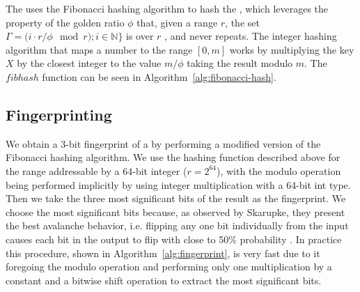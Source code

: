 The \dBHT uses the Fibonacci hashing algorithm \cite{Skarupke2018} to hash the \kmers, which leverages the property of the golden ratio $\phi$ that, given a range $r$, the set $\Gamma = {(i\cdot r}/{\phi} \mod r) ; i \in \mathbb{N}\}$ is  over $r$ , and never repeats. The integer hashing algorithm that maps a number to the range $[0, m]$ works by multiplying the key $X$ by the closest integer to the value $m/\phi$ taking the result modulo $m$. The $\mathit{fibhash}$ function can be seen in Algorithm~\ref{alg:fibonacci-hash}.

\begin{algorithm}
  \caption{$\mathit{fibhash}(X, m)$}\label{alg:fibonacci-hash}
\end{algorithm}

\subsection{\kmer Fingerprinting}\label{sec:fingerprint}

We obtain a 3-bit fingerprint of a \kmer by performing a modified version of the Fibonacci hashing algorithm. We use the hashing function described above for the range addressable by a 64-bit integer ($r=2^{64}$), with the modulo operation being performed implicitly by using integer multiplication with a 64-bit int type. Then we take the three most significant bits of the result as the fingerprint. We choose the most significant bits because, as observed by Skarupke, they present the best avalanche behavior, i.e. flipping any one bit individually from the input causes each bit in the output to flip with close to 50\% probability \cite{Skarupke2018}. In practice this procedure, shown in Algorithm~\ref{alg:fingerprint}, is very fast due to it foregoing the modulo operation and performing only one multiplication by a constant and a bitwise shift operation to extract the most significant bits.

